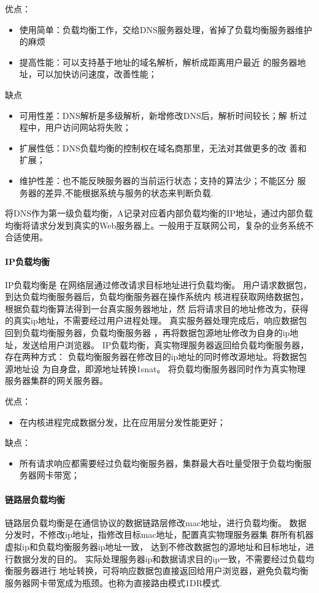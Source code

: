优点：
\begin{itemize}
\item 使用简单：负载均衡工作，交给DNS服务器处理，省掉了负载均衡服务器维护的麻烦
\item 提高性能：可以支持基于地址的域名解析，解析成距离用户最近
的服务器地址，可以加快访问速度，改善性能；
\end{itemize}

缺点
\begin{itemize}
\item 可用性差：DNS解析是多级解析，新增修改DNS后，解析时间较长；解
析过程中，用户访问网站将失败；
\item 扩展性低：DNS负载均衡的控制权在域名商那里，无法对其做更多的改
善和扩展；
\item 维护性差：也不能反映服务器的当前运行状态；支持的算法少；不能区分
服务器的差异,不能根据系统与服务的状态来判断负载.
\end{itemize}

将DNS作为第一级负载均衡，A记录对应着内部负载均衡的IP地址，通过内部负载
均衡将请求分发到真实的Web服务器上。一般用于互联网公司，复杂的业务系统不合适使用。
\paragraph{IP负载均衡}
IP负载均衡是
在网络层通过修改请求目标地址进行负载均衡。
用户请求数据包，到达负载均衡服务器后，负载均衡服务器在操作系统内
核进程获取网络数据包，根据负载均衡算法得到一台真实服务器地址，然
后将请求目的地址修改为，获得的真实ip地址，不需要经过用户进程处理。
真实服务器处理完成后，响应数据包回到负载均衡服务器，负载均衡服务器
，再将数据包源地址修改为自身的ip地址，发送给用户浏览器。
IP负载均衡，真实物理服务器返回给负载均衡服务器，存在两种方式：
负载均衡服务器在修改目的ip地址的同时修改源地址。将数据包源地址设
为自身盘，即源地址转换1snat。
将负载均衡服务器同时作为真实物理服务器集群的网关服务器。

优点：
\begin{itemize}
\item 在内核进程完成数据分发，比在应用层分发性能更好；
\end{itemize}

缺点：
\begin{itemize}
\item 所有请求响应都需要经过负载均衡服务器，集群最大吞吐量受限于负载均衡服务器网卡带宽；
\end{itemize}
\paragraph{链路层负载均衡}
链路层负载均衡是在通信协议的数据链路层修改mac地址，进行负载均衡。
数据分发时，不修改ip地址，指修改目标mac地址，配置真实物理服务器集
群所有机器虚拟ip和负载均衡服务器ip地址一致，
达到不修改数据包的源地址和目标地址，进行数据分发的目的。
实际处理服务器ip和数据请求目的ip一致，不需要经过负载均衡服务器进行
地址转换，可将响应数据包直接返回给用户浏览器，避免负载均衡
服务器网卡带宽成为瓶颈。也称为直接路由模式1DR模式.


